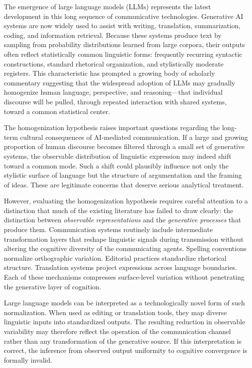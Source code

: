\documentclass[12pt,a4paper]{article}
\theoremstyle{definition}
\theoremstyle{plain}
\theoremstyle{remark}
\begin{document}
The emergence of large language models (LLMs) represents the latest development in this long
sequence of communicative technologies. Generative AI systems are now widely used to assist
with writing, translation, summarization, coding, and information retrieval. Because these
systems produce text by sampling from probability distributions learned from large corpora,
their outputs often reflect statistically common linguistic forms: frequently recurring
syntactic constructions, standard rhetorical organization, and stylistically moderate
registers. This characteristic has prompted a growing body of scholarly commentary suggesting
that the widespread adoption of LLMs may gradually homogenize human language, perspective,
and reasoning---that individual discourse will be pulled, through repeated interaction with
shared systems, toward a common statistical center.

The homogenization hypothesis raises important questions regarding the long-term cultural
consequences of AI-mediated communication. If a large and growing proportion of human
discourse becomes filtered through a small set of generative systems, the observable
distribution of linguistic expression may indeed shift toward a common mode. Such a shift
could plausibly influence not only the stylistic surface of language but the structure of
argumentation and the framing of ideas. These are legitimate concerns that deserve serious
analytical treatment.

However, evaluating the homogenization hypothesis requires careful attention to a distinction
that much of the existing literature has failed to draw clearly: the distinction between
\emph{observable representations} and the \emph{generative processes} that produce them.
Communication systems routinely include intermediate transformation layers that reshape
linguistic signals during transmission without altering the cognitive diversity of the
communicating agents. Spelling conventions normalize orthographic variation. Editorial
practices standardize rhetorical structure. Translation systems project expressions across
language boundaries. Each of these mechanisms compresses surface-level variation without
penetrating the generative layer of cognition.

Large language models can be interpreted as a technologically novel form of such
normalization. When used as editing or translation tools, they map diverse linguistic inputs
into standardized outputs. The resulting reduction in observable variability may therefore
reflect the operation of the communication channel rather than any transformation of the
generative source. If this interpretation is correct, the inference from observed output
uniformity to cognitive convergence is formally invalid.
\end{document}
